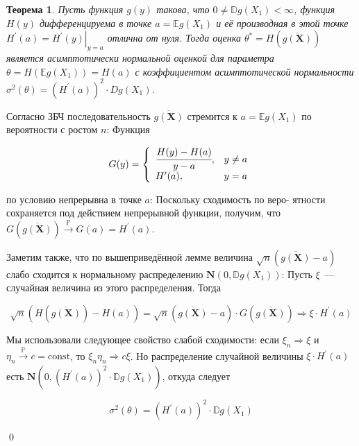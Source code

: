 \documentclass[oneside,final,14pt]{extreport}
\renewenvironment{proof}{{\bfseries Доказательство.}}{\qed}
\newtheorem{thm}{Теорема}[section]
\theoremstyle{definition}
\begin{document}
\begin{thm}
Пусть функция $g(y)$ такова, что $0 \neq \mathbb{D} g\left(X_{1}\right)<\infty$, функция $H(y)$ дифференцируема в точке $a=\mathbb{E} g\left(X_{1}\right)$ и её производная в этой точке $H^{\prime}(a)=\left.H^{\prime}(y)\right|_{y=a}$ отлична от нуля. Тогда оценка $\theta^{*}=H(\overline{g(\mathbf{X})})$
является асимптотически нормальной
оценкой для параметра $\theta=H\left(\mathbb{E} g\left(X_{1}\right)\right)=H(a)$ с коэффициентом асимптотической нормальности $\sigma^{2}(\theta)=\left(H^{\prime}(a)\right)^{2} \cdot D g\left(X_{1}\right)$.
\end{thm}

\begin{proof}
Согласно ЗБЧ последовательность $\overline{g(\mathbf{X})}$ стремится к $a=\mathbb{E} g\left(X_{1}\right)$ по вероятности с ростом $n$: Функция

\begin{equation*}
    G(y)=\left\{\begin{array}{ll}
    \cfrac{H(y)-H(a)}{y-a}, & y \neq a \\
    H^{\prime}(a), & y=a
    \end{array}\right.  
\end{equation*}

по условию непрерывна в точке $a$: Поскольку сходимость по веро-
ятности сохраняется под действием непрерывной функции, получим,
что $G(\overline{g(\mathbf{X})}) \xrightarrow[]{\mathbb{P}} G(a)=H^{\prime}(a)$.

Заметим также, что по вышеприведённой лемме величина $\sqrt{n}(\overline{g(\mathbf{X})}-a)$ слабо сходится
к нормальному распределению $\mathbf{N}(0, \mathbb{D} g(X_{1}))$: Пусть $\xi$~--- случайная величина
из этого распределения. Тогда

\begin{equation*}
    \sqrt{n}(H(\overline{g(\mathbf{X})})-H(a))=\sqrt{n}(\overline{g(\mathbf{X})}-a) \cdot G(\overline{g(\mathbf{X})}) \Rightarrow \xi \cdot H^{\prime}(a)
\end{equation*}

Мы использовали следующее свойство слабой сходимости: если $\xi_{n} \Rightarrow \xi$ и $\eta_{n} \xrightarrow[]{\mathbb{P}} c=\mathrm{const}$, то $\xi_{n} \eta_{n} \Rightarrow c \xi$. Но распределение случайной величины $\xi \cdot H^{\prime}(a)$ есть $\mathbf{N}(0,(H^{\prime}(a))^{2} \cdot \mathbb{D} g(X_{1}))$, откуда следует

\begin{equation*}
    \sigma^{2}(\theta)=\left(H^{\prime}(a)\right)^{2} \cdot \mathbb{D} g\left(X_{1}\right)
\end{equation*}

\end{proof}
\end{document}
